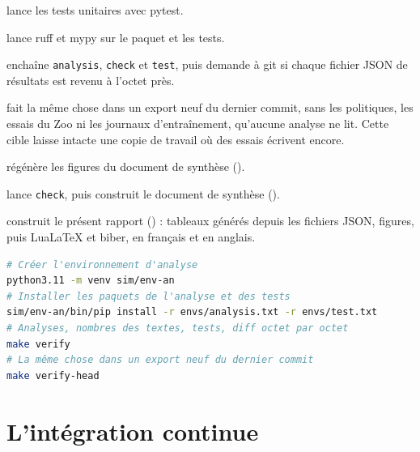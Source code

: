 \begin{description}[style=nextline,leftmargin=1.5em]
  \item[\texttt{make test}] lance les tests unitaires avec pytest.
  \item[\texttt{make lint}] lance ruff et mypy sur le paquet et les tests.
  \item[\texttt{make verify}] enchaîne \texttt{analysis}, \texttt{check} et \texttt{test}, puis
        demande à git si chaque fichier JSON de résultats est revenu à l'octet près.
  \item[\texttt{make verify-head}] fait la même chose dans un export neuf du dernier commit, sans
        les politiques, les essais du Zoo ni les journaux d'entraînement, qu'aucune analyse ne lit.
        Cette cible laisse intacte une copie de travail où des essais écrivent encore.
  \item[\texttt{make figures}] régénère les figures du document de synthèse
        ().
  \item[\texttt{make docs}] lance \texttt{check}, puis construit le document de synthèse
        ().
  \item[\texttt{make report}] construit le présent rapport () : tableaux
        générés depuis les fichiers JSON, figures, puis LuaLaTeX et biber, en français et en
        anglais.
\end{description}

\begin{lstlisting}[language=bash,caption={Recalculer tous les nombres depuis les résultats commités, sans entraînement.},captionpos=b]
# Créer l'environnement d'analyse
python3.11 -m venv sim/env-an
# Installer les paquets de l'analyse et des tests
sim/env-an/bin/pip install -r envs/analysis.txt -r envs/test.txt
# Analyses, nombres des textes, tests, diff octet par octet
make verify
# La même chose dans un export neuf du dernier commit
make verify-head
\end{lstlisting}

\section{L'intégration continue}
\label{sec:ci}

